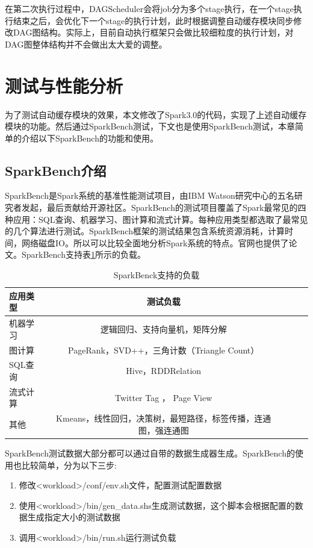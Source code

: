 在第二次执行过程中，DAGScheduler会将job分为多个stage执行，在一个stage执行结束之后，会优化下一个stage的执行计划，此时根据调整自动缓存模块同步修改DAG图结构。实际上，目前自动执行框架只会做比较细粒度的执行计划，对DAG图整体结构并不会做出太大爱的调整。

\section{测试与性能分析}

为了测试自动缓存模块的效果，本文修改了Spark3.0的代码，实现了上述自动缓存模块的功能。然后通过SparkBench测试，下文也是使用SparkBench测试，本章简单的介绍以下SparkBench的功能和使用。

\subsection{SparkBench介绍}

SparkBench是Spark系统的基准性能测试项目，由IBM Watson研究中心的五名研究者发起，最后贡献给开源社区。SparkBench的测试项目覆盖了Spark最常见的四种应用：SQL查询、机器学习、图计算和流式计算。每种应用类型都选取了最常见的几个算法进行测试。SparkBench框架的测试结果包含系统资源消耗，计算时间，网络磁盘IO。所以可以比较全面地分析Spark系统的特点。官网也提供了论文。SparkBench支持表\ref{tab:workload}所示的负载。

\begin{table}
 \centering
 \caption{SparkBenck支持的负载}
 \label{tab:workload}
 \begin{tabular}{lcccl}
  \toprule
  应用类型 & 测试负载 \\
  \midrule
  机器学习 & 逻辑回归、支持向量机，矩阵分解  \\
  图计算 &  PageRank，SVD++，三角计数（Triangle Count） \\
  SQL查询 & Hive，RDDRelation  \\
  流式计算 & Twitter Tag ， Page View  \\
  其他 &  Kmeans，线性回归，决策树，最短路径，标签传播，连通图，强连通图 \\
  \bottomrule
 \end{tabular}
\end{table}

SparkBench测试数据大部分都可以通过自带的数据生成器生成。SparkBench的使用也比较简单，分为以下三步:

\begin{enumerate}
    \item 修改<workload>/conf/env.sh文件，配置测试配置数据
    \item 使用<workload>/bin/gen\_data.shs生成测试数据，这个脚本会根据配置的数据生成指定大小的测试数据
    \item 调用<workload>/bin/run.sh运行测试负载
\end{enumerate}

